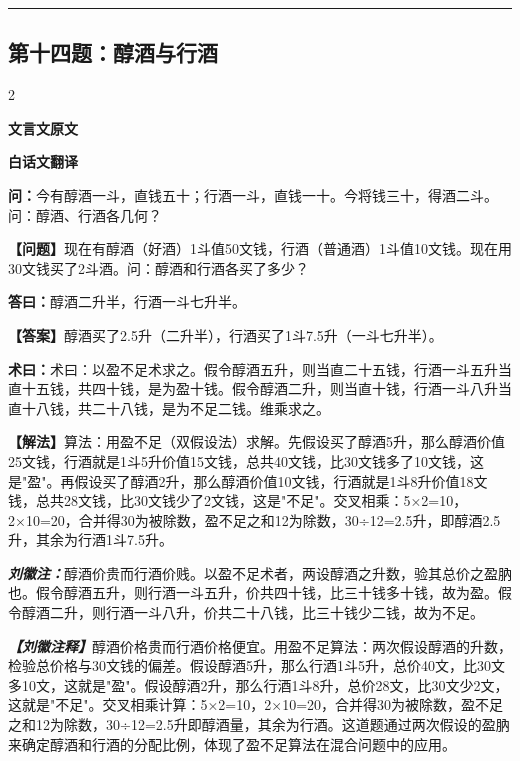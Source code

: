 \documentclass[10pt,a4paper]{article}
\newcommand{\wen}[1]{\textbf{\color{problemcolor}问：}#1\par}
\newcommand{\da}[1]{\textbf{答曰：}#1\par}
\newcommand{\shu}[1]{\textbf{术曰：}#1\par}
\newcommand{\liuhui}[1]{{\color{commentarycolor}\textit{\textbf{刘徽注：}}#1\par}}
\newcommand{\classicalheader}[1]{{\centering\large\bfseries\color{classicalcolor} #1\par\vspace{0.5em}}}
\newcommand{\wenmodern}[1]{\textbf{\color{moderncolor}【问题】}#1\par}
\newcommand{\damodern}[1]{\textbf{【答案】}#1\par}
\newcommand{\shumodern}[1]{\textbf{【解法】}#1\par}
\newcommand{\liuhuimodern}[1]{{\color{commentarycolor}\textit{\textbf{【刘徽注释】}}#1\par}}
\newcommand{\modernheader}[1]{{\centering\large\bfseries\color{moderncolor} #1\par\vspace{0.5em}}}
\newcommand{\problemsec}[1]{\subsection*{#1}}
\begin{document}
\vspace{0.3cm}
\hrule
\vspace{0.3cm}

\problemsec{第十四题：醇酒与行酒}
\begin{paracol}{2}
\classicalheader{文言文原文}
\switchcolumn
\modernheader{白话文翻译}
\switchcolumn*

\wen{今有醇酒一斗，直钱五十；行酒一斗，直钱一十。今将钱三十，得酒二斗。问：醇酒、行酒各几何？}

\switchcolumn

\wenmodern{现在有醇酒（好酒）1斗值50文钱，行酒（普通酒）1斗值10文钱。现在用30文钱买了2斗酒。问：醇酒和行酒各买了多少？}

\switchcolumn*

\da{醇酒二升半，行酒一斗七升半。}

\switchcolumn

\damodern{醇酒买了2.5升（二升半），行酒买了1斗7.5升（一斗七升半）。}

\switchcolumn*

\shu{术曰：以盈不足术求之。假令醇酒五升，则当直二十五钱，行酒一斗五升当直十五钱，共四十钱，是为盈十钱。假令醇酒二升，则当直十钱，行酒一斗八升当直十八钱，共二十八钱，是为不足二钱。维乘求之。}

\switchcolumn

\shumodern{算法：用盈不足（双假设法）求解。先假设买了醇酒5升，那么醇酒价值25文钱，行酒就是1斗5升价值15文钱，总共40文钱，比30文钱多了10文钱，这是"盈"。再假设买了醇酒2升，那么醇酒价值10文钱，行酒就是1斗8升价值18文钱，总共28文钱，比30文钱少了2文钱，这是"不足"。交叉相乘：5×2=10，2×10=20，合并得30为被除数，盈不足之和12为除数，30÷12=2.5升，即醇酒2.5升，其余为行酒1斗7.5升。}

\switchcolumn*

\liuhui{醇酒价贵而行酒价贱。以盈不足术者，两设醇酒之升数，验其总价之盈肭也。假令醇酒五升，则行酒一斗五升，价共四十钱，比三十钱多十钱，故为盈。假令醇酒二升，则行酒一斗八升，价共二十八钱，比三十钱少二钱，故为不足。}

\switchcolumn

\liuhuimodern{醇酒价格贵而行酒价格便宜。用盈不足算法：两次假设醇酒的升数，检验总价格与30文钱的偏差。假设醇酒5升，那么行酒1斗5升，总价40文，比30文多10文，这就是"盈"。假设醇酒2升，那么行酒1斗8升，总价28文，比30文少2文，这就是"不足"。交叉相乘计算：5×2=10，2×10=20，合并得30为被除数，盈不足之和12为除数，30÷12=2.5升即醇酒量，其余为行酒。这道题通过两次假设的盈肭来确定醇酒和行酒的分配比例，体现了盈不足算法在混合问题中的应用。}

\end{paracol}
\end{document}
